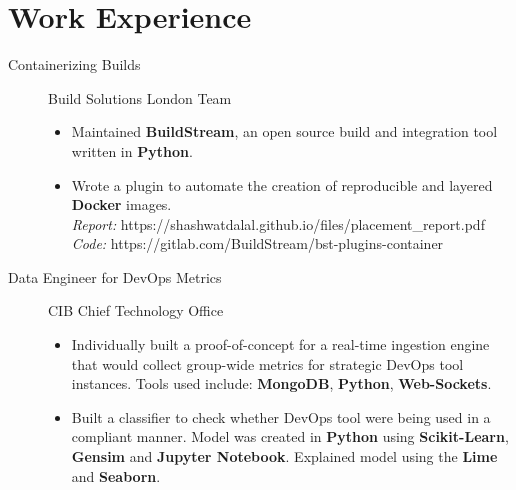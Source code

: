 \documentclass[a4paper]{deedy-resume} %
\begin{document}
\section{Work Experience}
\begin{description}
    \item[Containerizing Builds] Build Solutions London Team
        \begin{itemize}
            \item Maintained \textbf{BuildStream}, an open source build and integration tool written in \textbf{Python}.
            \item Wrote a plugin to automate the creation of reproducible and layered \textbf{Docker} images.
            \\
            \textit{Report:} https://shashwatdalal.github.io/files/placement\_report.pdf \\
            \textit{Code:} https://gitlab.com/BuildStream/bst-plugins-container
        \end{itemize}
\end{description}
\begin{description}
    \item[Data Engineer for DevOps Metrics] CIB Chief Technology Office
        \begin{itemize}
            \item Individually built a proof-of-concept for a real-time ingestion engine that would collect group-wide metrics for strategic DevOps tool instances. Tools used include: \textbf{MongoDB}, \textbf{Python}, \textbf{Web-Sockets}.
            \item Built a classifier to check whether DevOps tool were being used in a compliant manner. Model was created in \textbf{Python} using \textbf{Scikit-Learn}, \textbf{Gensim} and \textbf{Jupyter Notebook}. Explained model using the \textbf{Lime} and \textbf{Seaborn}.
        \end{itemize}
\end{description}
\end{document}
